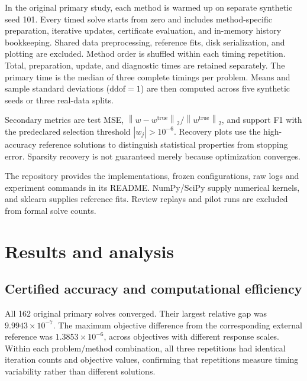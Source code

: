\documentclass{article}
\newcommand{\norm}[1]{\left\|#1\right\|}
\newcommand{\resultdir}{../outputs/formal_20261119T120859Z}
\begin{document}
In the original primary study, each method is warmed up on separate synthetic seed 101. Every timed solve starts from zero and includes method-specific preparation, iterative updates, certificate evaluation, and in-memory history bookkeeping. Shared data preprocessing, reference fits, disk serialization, and plotting are excluded. Method order is shuffled within each timing repetition. Total, preparation, update, and diagnostic times are retained separately. The primary time is the median of three complete timings per problem. Means and sample standard deviations ($\mathrm{ddof}=1$) are then computed across five synthetic seeds or three real-data splits.

Secondary metrics are test MSE, $\norm{w-w^{\mathrm{true}}}_2/\norm{w^{\mathrm{true}}}_2$, and support F1 with the predeclared selection threshold $|w_j|>10^{-6}$. Recovery plots use the high-accuracy reference solutions to distinguish statistical properties from stopping error. Sparsity recovery is not guaranteed merely because optimization converges.

The repository provides the implementations, frozen configurations, raw logs and experiment commands in its README. NumPy/SciPy supply numerical kernels, and sklearn supplies reference fits. Review replays and pilot runs are excluded from formal solve counts.

\section{Results and analysis}
\subsection{Certified accuracy and computational efficiency}
All 162 original primary solves converged. Their largest relative gap was $9.9943\times10^{-7}$. The maximum objective difference from the corresponding external reference was $1.3853\times10^{-6}$, across objectives with different response scales. Within each problem/method combination, all three repetitions had identical iteration counts and objective values, confirming that repetitions measure timing variability rather than different solutions.

\begin{table}[ht]
\centering\small

\caption{Total time and iterations: mean $\pm$ sample SD across dataset seeds after median timing aggregation. Diagnostic percentages are mean per-problem fractions of total time. Synthetic tasks use $n=1000,p=200$; Diabetes uses $n=309,p=10$.}
\label{tab:timing}
\end{table}
\end{document}
